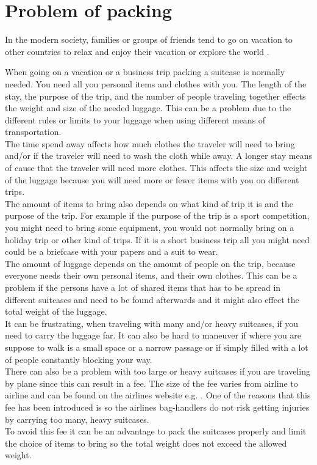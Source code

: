 \section{Problem of packing}
In the modern society, families or groups of friends tend to go on vacation to other countries to relax and enjoy their vacation or explore the world \citep{danskecharter}.

When going on a vacation or a business trip packing a suitcase is normally needed. You need all you personal items and clothes with you. The length of the stay, the purpose of the trip, and the number of people traveling together effects the weight and size of the needed luggage. This can be a problem due to the different rules or limits to your luggage when using different means of transportation.\\

The time spend away affects how much clothes the traveler will need to bring and/or if the traveler will need to wash the cloth while away. A longer stay means of cause that the traveler will need more clothes. This affects the size and weight of the luggage because you will need more or fewer items with you on different trips.\\
 
The amount of items to bring also depends on what kind of trip it is and the purpose of the trip. For example if the purpose of the trip is a sport competition, you might need to bring some equipment, you would not normally bring on a holiday trip or other kind of trips. If it is a short business trip all you might need could be a briefcase with your papers and a suit to wear.\\

The amount of luggage depends on the amount of people on the trip, because everyone needs their own personal items, and their own clothes. This can be a problem if the persons have a lot of shared items that has to be spread in different suitcases and need to be found afterwards and it might also effect the total weight of the luggage.\\

It can be frustrating, when traveling with many and/or heavy suitcases, if you need to carry the luggage far. It can also be hard to maneuver if where you are suppose to walk is a small space or a narrow passage or if simply filled with a lot of people constantly blocking your way.\\
 
There can also be a problem with too large or heavy suitcases if you are traveling by plane since this can result in a fee. The size of the fee varies from airline to airline and can be found on the airlines website e.g.  \citep{altombag}. One of the reasons that this fee has been introduced is so the airlines bag-handlers do not risk getting injuries by carrying too many, heavy suitcases.\\ 
To avoid this fee it can be an advantage to pack the suitcases properly and limit the choice of items to bring so the total weight does not exceed the allowed weight.\\

